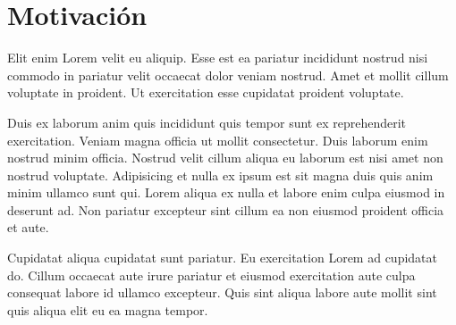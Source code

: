 \section{Motivación}
Elit enim Lorem velit eu aliquip. Esse est ea pariatur incididunt nostrud nisi commodo in pariatur velit occaecat dolor veniam nostrud. Amet et mollit cillum voluptate in proident. Ut exercitation esse cupidatat proident voluptate.

Duis ex laborum anim quis incididunt quis tempor sunt ex reprehenderit exercitation. Veniam magna officia ut mollit consectetur. Duis laborum enim nostrud minim officia. Nostrud velit cillum aliqua eu laborum est nisi amet non nostrud voluptate. Adipisicing et nulla ex ipsum est sit magna duis quis anim minim ullamco sunt qui. Lorem aliqua ex nulla et labore enim culpa eiusmod in deserunt ad. Non pariatur excepteur sint cillum ea non eiusmod proident officia et aute.

Cupidatat aliqua cupidatat sunt pariatur. Eu exercitation Lorem ad cupidatat do. Cillum occaecat aute irure pariatur et eiusmod exercitation aute culpa consequat labore id ullamco excepteur. Quis sint aliqua labore aute mollit sint quis aliqua elit eu ea magna tempor.
